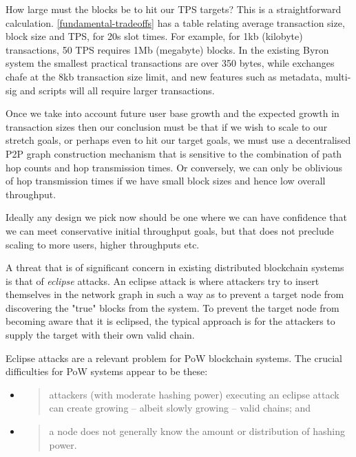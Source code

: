 \documentclass[11pt,a4paper]{article}
\begin{document}
How large must the blocks be to hit our TPS targets? This is a
straightforward calculation.
\cref{fundamental-tradeoffs} has a table
relating average transaction size, block size and TPS, for 20s slot
times. For example, for 1kb (kilobyte) transactions, 50 TPS requires 1Mb
(megabyte) blocks. In the existing Byron system the smallest practical
transactions are over 350 bytes, while exchanges chafe at the 8kb
transaction size limit, and new features such as metadata, multi-sig and
scripts will all require larger transactions.

Once we take into account future user base growth and the expected
growth in transaction sizes then our conclusion must be that if we wish
to scale to our stretch goals, or perhaps even to hit our target goals,
we must use a decentralised P2P graph construction mechanism that is
sensitive to the combination of path hop counts and hop transmission
times. Or conversely, we can only be oblivious of hop transmission times
if we have small block sizes and hence low overall throughput.

Ideally any design we pick now should be one where we can have
confidence that we can meet conservative initial throughput goals, but
that does not preclude scaling to more users, higher throughputs etc.

A threat that is of significant concern in existing distributed
blockchain systems is that of \emph{eclipse} attacks. An eclipse attack
is where attackers try to insert themselves in the network graph in such
a way as to prevent a target node from discovering the "true" blocks
from the system. To prevent the target node from becoming aware that it
is eclipsed, the typical approach is for the attackers to supply the
target with their own valid chain.

Eclipse attacks are a relevant problem for PoW blockchain systems. The
crucial difficulties for PoW systems appear to be these:

\begin{itemize}
\item
  \begin{quote}
  attackers (with moderate hashing power) executing an eclipse attack
  can create growing -- albeit slowly growing -- valid chains; and
  \end{quote}
\item
  \begin{quote}
  a node does not generally know the amount or distribution of hashing
  power.
  \end{quote}
\end{itemize}
\end{document}
